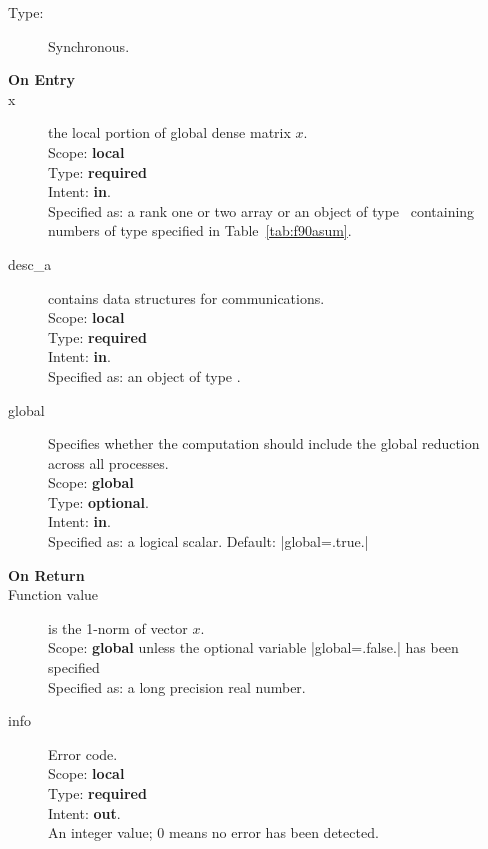 \begin{description}
\item[Type:] Synchronous.
\item[\bf On Entry]
\item[x] the local portion of global dense matrix
$x$. %
\\
Scope: {\bf local} \\
Type: {\bf required} \\
Intent: {\bf in}.\\
Specified as: a rank one or two array or an object of type \vdata\
containing numbers of type specified in
Table~\ref{tab:f90asum}.
\item[desc\_a] contains data structures for communications.\\
Scope: {\bf local} \\
Type: {\bf required}\\
Intent: {\bf in}.\\
Specified as: an object of type \descdata.
\item[global]  Specifies whether the computation should include the
  global reduction across all processes.\\
Scope: {\bf global} \\
Type: {\bf optional}.\\
Intent: {\bf in}.\\
Specified as: a logical scalar.
Default: \fortinline|global=.true.|\\

\item[\bf On Return]
\item[Function value] is the 1-norm of vector $x$.\\
Scope: {\bf global} unless the optional variable
\fortinline|global=.false.| has been specified\\
Specified as: a long precision real  number.
\item[info] Error code.\\
Scope: {\bf local} \\
Type: {\bf required} \\
Intent: {\bf out}.\\
An integer value; 0 means no error has been detected.
\end{description}

